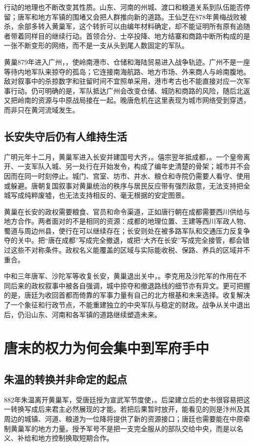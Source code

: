 行动的地理也不断改变其性质。山东、河南的州城、渡口和粮道关系到队伍能否停留；唐军和地方军镇的围堵又会把人群推向新的道路。王仙芝在878年黄梅战败被杀，余部多转入黄巢军，这个转折可以由编年材料确定，却不能证明所有原有追随者带着同样目的继续行动。首领合分、士卒投降、地方结寨和商路中断所构成的是一张不断变形的网络，而不是一支从头到尾人数固定的军队。

黄巢879年进入广州，，使岭南港市、仓储和海陆贸易进入战争轨迹。广州不是一座等待内地军队来掠夺的孤岛；它连接南海航路、地方市场、外来商人与岭南腹地。敌对叙事中的杀掠数字和驻留时间不宜照单采用，港市考古也不能直接对应一次军事行动。仍可明确的是，军队抵达广州会改变仓储、城防和商路的风险，随后北返又把岭南的资源与中原战局接在一起。晚唐危机在这里表现为城市网络受到穿透，而非只在黄河流域发生。

\subsection{长安失守后仍有人维持生活}
广明元年十二月，黄巢军进入长安并建国号大齐，。僖宗翌年抵成都，。一个皇帝离开、一支军队入城、另一处行在开始发令，构成了编年史清楚的骨架；城市并不会因而在同一时刻停止。城门、宫室、坊市、井水、粮仓和寺院仍需要人看守、使用或躲避。唐朝复国叙事对黄巢统治的秩序与居民反应带有强烈敌意，无法支持把全城写成纯粹废墟，也无法支持相反的、毫无根据的安定图景。

黄巢在长安的政权需要粮食、官员和命令渠道，正如唐行朝在成都需要西川供给与地方合作。两者面对的不是相同的资源：成都的地理位置、王建等西川军政人物、蜀道与周边州县，使行在可以继续存在；长安则处在被多路军队和交通压力反复争夺的关中。把“唐在成都”写成完全撤退，或把“大齐在长安”写成完全接管，都会错过这些不对称条件。政权名义能覆盖的区域与实际能收税、保路、养兵的区域并不重合。

中和三年唐军、沙陀军等收复长安，黄巢退出关中，。李克用及沙陀军的作用在不同后来的政权叙事中被各自强调，城中掠夺和撤退路线的细节亦有异文。更可把握的是，唐廷为收回首都而倚靠的军事力量有自己的北方根基和未来选择。收复解决了一个象征和行政节点，不能重建独立的中央军队与稳定的财政。战争从关中退出后，仍沿山东、河南和各军镇的道路继续塑造未来。

\section{唐末的权力为何会集中到军府手中}

\subsection{朱温的转换并非命定的起点}
882年朱温离开黄巢军，受唐廷授为宣武军节度使，。后梁建立后的史书很容易把这一转换写成后来君主必然展现的才能。若把后果暂时放开，能看见的则是汴州及其周边的城镇、河道、粮道为一位降将提供了新的资源接口；唐廷也需要能在中原牵制黄巢军的地方力量。授予军号不是把一支完全服从的部队交给中央，而是以名义、补给和地方控制换取短期合作。

